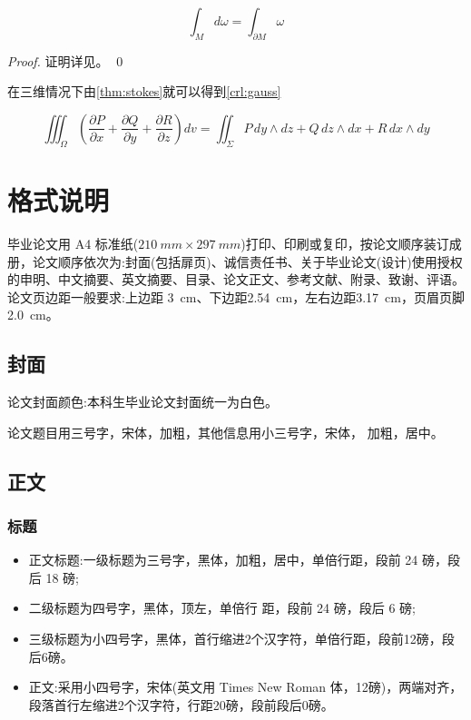 \documentclass{LZU}
\begin{document}
\begin{theorem}[斯托克斯公式]
    \begin{equation}
        \int_M d\omega = \int_{\partial M} \omega
    \end{equation}
    \label{thm:stokes}
\end{theorem}
\begin{proof}
    证明详见\cite{stokes}。
    \qed
\end{proof}
在三维情况下由\cref{thm:stokes}就可以得到\cref{crl:gauss}
\begin{corollary}[高斯公式]
    \[\iiint_{\Omega}\left(\frac{\partial P}{\partial x}+\frac{\partial Q}{\partial y}+\frac{\partial R}{\partial z}\right)dv=\iint_{\Sigma}P\,dy\wedge dz+Q\,dz\wedge dx+R\,dx\wedge dy\]
    \label{crl:gauss}
\end{corollary}



\chapter{格式说明}
\label{chp:format}
毕业论文用 A4 标准纸($\SI{210}{mm}\times \SI{297}{mm}$)打印、印刷或复印，按论文顺序装订成册，论文顺序依次为:封面(包括扉页)、诚信责任书、关于毕业论文(设计)使用授权的申明、中文摘要、英文摘要、目录、论文正文、参考文献、附录、致谢、评语。论文页边距一般要求:上边距 \SI{3}{cm}、下边距\SI{2.54}{cm}，左右边距\SI{3.17}{cm}，页眉页脚\SI{2.0}{cm}。
\section{封面}
论文封面颜色:本科生毕业论文封面统一为白色。

论文题目用三号字，宋体，加粗，其他信息用小三号字，宋体， 加粗，居中。
\section{正文}
\subsection{标题}
\begin{itemize}
    \item 正文标题:一级标题为三号字，黑体，加粗，居中，单倍行距，段前 24 磅，段后 18 磅;
    \item 二级标题为四号字，黑体，顶左，单倍行 距，段前 24 磅，段后 6 磅;
    \item 三级标题为小四号字，黑体，首行缩进2个汉字符，单倍行距，段前12磅，段后6磅。
    \item 正文:采用小四号字，宋体(英文用 Times New Roman 体，12磅)，两端对齐，段落首行左缩进2个汉字符，行距20磅，段前段后0磅。
\end{itemize}
\end{document}
